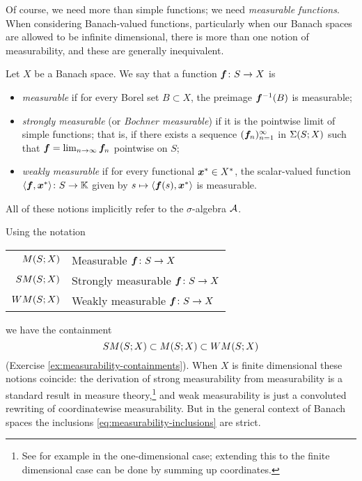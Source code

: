 Of course, we need more than simple functions; we need \emph{measurable functions}.
When considering Banach-valued functions, particularly when our Banach spaces are allowed to be infinite dimensional, there is more than one notion of measurability, and these are generally inequivalent.

\begin{defn}
  Let $X$ be a Banach space.
  We say that a function $\bm{f} \colon S \rightarrow X$ is
  \begin{itemize}
  \item
    \emph{measurable} if for every Borel set $B \subset X$, the preimage $\bm{f}^{-1}(B)$ is measurable;
  \item
    \emph{strongly measurable} (or \emph{Bochner measurable}) if it is the pointwise limit of simple functions; that is, if there exists a sequence $(\bm{f}_n)_{n=1}^\infty$ in $\Sigma(S;X)$ such that $\bm{f} = \lim_{n \to \infty} \bm{f}_n$ pointwise on $S$;
  \item
    \emph{weakly measurable} if for every functional $\bm{x}^* \in X^*$, the scalar-valued function $\langle \bm{f}, \bm{x}^*\rangle \colon S \rightarrow \mathbb{K}$ given by $s \mapsto \langle \bm{f}(s), \bm{x}^* \rangle$ is measurable.
  \end{itemize}
  All of these notions implicitly refer to the $\sigma$-algebra $\mathcal{A}$.
\end{defn}

Using the notation
\begin{center}
  \begin{tabular}{r|l}
    $M (S;X)$  & Measurable $\bm{f} \colon S \rightarrow X$    \\
    $SM(S;X)$  & Strongly measurable $\bm{f} \colon S \rightarrow X$ \\
    $WM(S;X)$  & Weakly measurable $\bm{f} \colon S \rightarrow X$
  \end{tabular}
\end{center}
we have the containment
\begin{equation}\label{eq:measurability-inclusions}
  SM(S;X) \subset M(S;X) \subset WM(S;X)
\end{equation}
(Exercise \ref{ex:measurability-containments}).
When $X$ is finite dimensional these notions coincide: the derivation of strong measurability from measurability is a standard result in measure theory,\footnote{See for example \cite[Corollary 4.2.7]{rD04} in the one-dimensional case; extending this to the finite dimensional case can be done by summing up coordinates.} and weak measurability is just a convoluted rewriting of coordinatewise measurability.
But in the general context of Banach spaces the inclusions \eqref{eq:measurability-inclusions} are strict.

